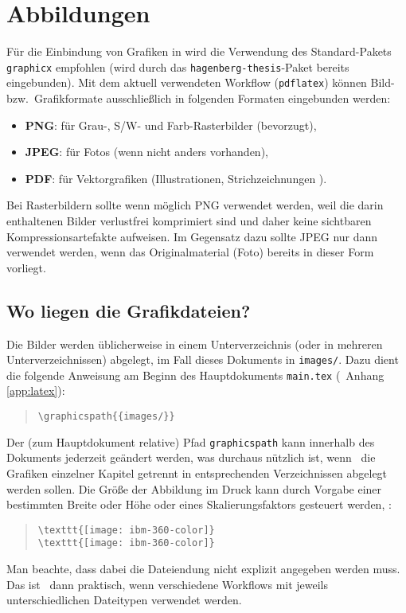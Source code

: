 \section{Abbildungen}

Für die Einbindung von Grafiken in \latex wird die Verwendung des
Stan\-dard-Pakets \texttt{graphicx} \cite{Carlisle2020} empfohlen (wird durch
das \texttt{hagenberg-thesis}-Paket bereits eingebunden). Mit dem aktuell
verwendeten Workflow (\texttt{pdflatex}) können Bild- bzw.\ Grafikformate
ausschließlich in folgenden Formaten eingebunden werden:
%
\begin{itemize}
	\item \textbf{PNG}: für Grau-, S/W- und Farb-Rasterbilder (bevorzugt),
	\item \textbf{JPEG}: für Fotos (wenn nicht anders vorhanden),
	\item \textbf{PDF}: für Vektorgrafiken (Illustrationen, Strichzeichnungen \etc).
\end{itemize}
%
Bei Rasterbildern sollte wenn möglich PNG verwendet werden, weil die darin
enthaltenen Bilder verlustfrei komprimiert sind und daher keine sichtbaren
Kompressionsartefakte aufweisen. Im Gegensatz dazu sollte JPEG nur dann
verwendet werden, wenn das Originalmaterial (Foto) bereits in dieser Form
vorliegt.


\subsection{Wo liegen die Grafikdateien?}

Die Bilder werden üblicherweise in einem Unterverzeichnis (oder in mehreren
Unterverzeichnissen) abgelegt, im Fall dieses Dokuments in
\nolinkurl{images/}. Dazu dient die folgende Anweisung am Beginn des
Hauptdokuments \nolinkurl{main.tex} (\sa\ Anhang \ref{app:latex}):
%
\begin{quote}
	\verb!\graphicspath{{images/}}!
\end{quote}
%
Der (zum Hauptdokument relative) Pfad \texttt{graphicspath} kann innerhalb
des Dokuments jederzeit geändert werden, was durchaus nützlich ist, wenn \zB\
die Grafiken einzelner Kapitel getrennt in entsprechenden Verzeichnissen
abgelegt werden sollen.
Die Größe der Abbildung im Druck kann durch Vorgabe einer bestimmten Breite
oder Höhe oder eines Skalierungsfaktors gesteuert werden, {\zB}:
%
\begin{quote}
	\verb!\texttt{[image: ibm-360-color]}! \\
	\verb!\texttt{[image: ibm-360-color]}!
\end{quote}
%
Man beachte, dass dabei die Dateiendung nicht explizit angegeben werden muss.
Das ist \va\ dann praktisch, wenn verschiedene Workflows mit jeweils
unterschiedlichen Dateitypen verwendet werden.


